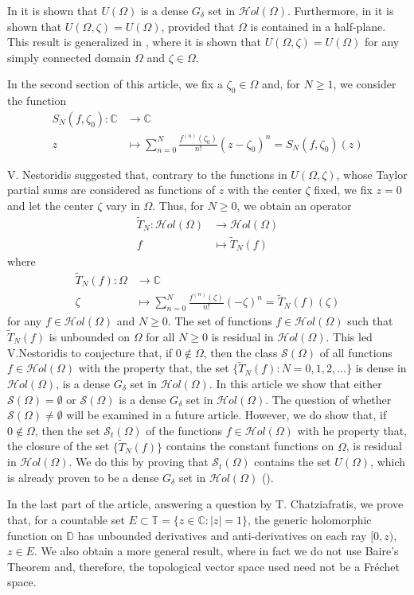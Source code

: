 \documentclass[11pt,twoside,a4paper]{article}
\theoremstyle{remark}
\def\d{\delta}
\newcommand{\holo}{{\mathcal Hol}(\Omega)}
\newcommand{\ttn}{\widetilde{T}_N}
\newcommand{\so}{\mathcal{S}(\Omega)}
\newcommand{\sto}{\mathcal{S}_t(\Omega)}
\newcommand{\uo}{U(\Omega)}
\newcommand{\uoz}                                                                                                    {U(\Omega, \zeta)}
\begin{document}
In \cite{nestoridis1999extension} it is shown that $\uo$ is a dense $G_\d$ set in $\holo$. Furthermore, in \cite{melas2001universality} it is shown that $\uoz = \uo$, provided that $\Omega$ is contained in a half-plane. This result is generalized in \cite{muller2006universal}, where it is shown that $\uoz = \uo$ for any simply connected domain $\Omega$ and $\zeta \in \Omega$.
\par
In the second section of this article, we fix a $\zeta_0 \in \Omega$ and, for $N \geq 1$, we consider the function
\begin{align*}
  S_N(f,\zeta_0): \mathbb{C} & \rightarrow \mathbb{C} \\
  z& \mapsto \sum_{n=0}^{N}\frac{f^{(n)}(\zeta_0)}{n!}(z-\zeta_0)^n = S_N(f,\zeta_0)(z)
\end{align*}

 \par
V. Nestoridis suggested that, contrary to the functions in $ \uoz$, whose Taylor partial sums are considered as functions of $z$ with the center $\zeta$ fixed, we fix $z=0$ and let the center $\zeta$ vary in $\Omega$. Thus, for $N \geq 0$, we obtain an operator
\begin{align*}
  \ttn : \holo & \rightarrow \holo \\
  f & \mapsto \ttn (f)
\end{align*}
where
\begin{align*}
  \ttn(f): \Omega & \rightarrow \mathbb{C}\\
  \zeta & \mapsto \sum_{n=0}^{N}\frac{f^{(n)}(\zeta)}{n!}(- \zeta)^n = \ttn (f)(\zeta)
\end{align*}
for any $f \in \holo$ and $N \geq 0$.
 The set of functions $f \in \holo$ such that $\ttn(f)$ is unbounded on $\Omega$ for all $N \geq 0$ is residual in $\holo$. This led V.Nestoridis to conjecture that,  if $0 \notin \Omega$, then the class $\so$ of all functions $f \in \holo$ with the property that, the set $\{\ttn (f): N = 0,1,2,...\}$ is dense in $\holo$, is a dense $G_\d$ set in $\holo$. In this article we show that either $\so = \emptyset$ or $\so$ is a dense $G_\d$ set in $\holo$. The question of whether $\so \neq \emptyset$ will be examined in a future article. However, we do show that, if $0 \notin \Omega$, then the set $\sto$ of the functions $f \in \holo$ with he property that, the closure of the set $\{\ttn (f)\}$ contains the constant functions on $\Omega$, is residual in $\holo$. We do this by proving that $\sto$ contains the set $\uo$, which is already proven to be a dense $G_\d$ set in $\holo$ (\cite{nestoridis1999extension}).
\par
In the last part of the article, answering a question by T. Chatziafratis, we prove that, for a countable set $E \subset \mathbb{T}=\{z \in \mathbb{C}: |z|=1\}$, the generic holomorphic function on $\mathbb{D}$ has unbounded derivatives and anti-derivatives on each ray $[0,z)$, $z \in E$. We also obtain a more general result, where in fact we do not use Baire's Theorem and, therefore, the topological vector space used need not be a Fr\'echet space.
\end{document}
